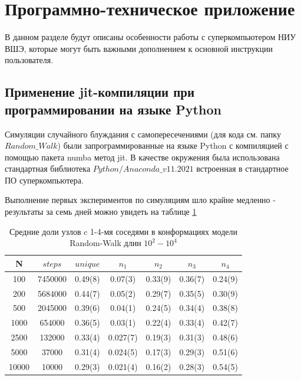 \section{Программно-техническое приложение}

В данном разделе будут описаны особенности работы с суперкомпьютером НИУ ВШЭ, которые могут быть важными дополнением к основной инструкции пользователя.

\subsection{Применение jit-компиляции при программировании на языке Python}
\label{subsection:njit_problem}

Симуляции случайного блуждания с самопересечениями (для кода см. папку $Random\_Walk$\cite{web:ProjectMagnetRepos}) были запрограммированные на языке Python с компиляцией с помощью пакета numba метод jit. В качестве окружения была использована стандартная библиотека $Python/Anaconda\_v11.2021$ встроенная в стандартное ПО суперкомпьютера. 

Выполнение первых экспериментов по симуляциям шло крайне медленно - результаты за семь дней можно увидеть на таблице \ref{tab:Ran_Walk_neigh_1}

\begin{table}[h]
    \centering
    \begin{tabular}{|c|c|c|c|c|c|c|}
        \hline
        N & $steps$ & $unique$ & $n_{1}$ & $n_{2}$ & $n_{3}$ & $n_{4}$ \\ \hline
        100 & 7450000 & 0.49(8) & 0.07(3) & 0.33(9) & 0.36(7) & 0.24(9) \\ \hline
        200 & 5684000 & 0.44(7) & 0.05(2) & 0.29(7) & 0.35(5) & 0.30(9) \\ \hline
        500 & 2045000 & 0.39(6) & 0.04(1) & 0.24(5) & 0.34(4) & 0.38(8) \\ \hline
        1000 & 654000 & 0.36(5) & 0.03(1) & 0.22(4) & 0.33(4) & 0.42(7) \\ \hline
        2500 & 132000 & 0.33(4) & 0.027(7) & 0.19(3) & 0.31(3) & 0.48(6)  \\ \hline
        5000 & 37000 & 0.31(4) & 0.024(5) & 0.17(3) & 0.29(3) & 0.51(6) \\ \hline
        10000 & 10000 & 0.29(3) & 0.021(4) & 0.16(2) & 0.28(3) & 0.54(5) \\ \hline
    \end{tabular}
    \caption{Средние доли узлов c 1-4-мя соседями в конформациях модели Random-Walk длин $10^{2}-10^{4}$}
    \label{tab:Ran_Walk_neigh_1}
\end{table}

